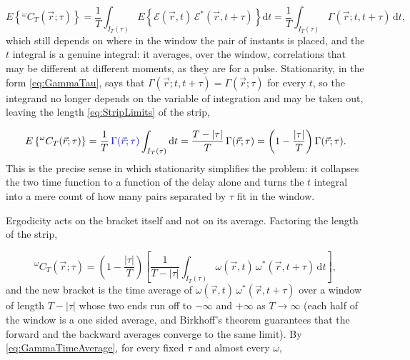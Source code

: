 		\begin{equation}\label{eq:CTnoHyp}
			E\left\{{}^{\omega}C_{T}(\vec{r};\tau)\right\} = \frac{1}{T}\int_{I_{T}(\tau)}E\left\{\mathcal{E}(\vec{r},t)\,\mathcal{E}^{*}(\vec{r},t+\tau)\right\}\mathrm{d}t
			= \frac{1}{T}\int_{I_{T}(\tau)}\Gamma(\vec{r};t,t+\tau)\,\mathrm{d}t ,
		\end{equation}
		which still depends on where in the window the pair of instants is placed, and the $t$
		integral is a genuine integral: it averages, over the window, correlations that may be
		different at different moments, as they are for a pulse. Stationarity, in the form
		\eqref{eq:GammaTau}, says that $\Gamma(\vec{r};t,t+\tau)=\Gamma(\vec{r};\tau)$ for every
		$t$, so the integrand no longer depends on the variable of integration and may be taken
		out, leaving the length \eqref{eq:StripLimits} of the strip,

		\begin{equation}\label{eq:CTstationary}
			E\left\{{}^{\omega}C_{T}(\vec{r};\tau)\right\} = \frac{1}{T}\,\textcolor{blue}{\Gamma(\vec{r};\tau)}\int_{I_{T}(\tau)}\mathrm{d}t
			= \frac{T-|\tau|}{T}\,\Gamma(\vec{r};\tau) = \left(1-\frac{|\tau|}{T}\right)\Gamma(\vec{r};\tau) .
		\end{equation}
		This is the precise sense in which stationarity simplifies the problem: it collapses the
		two time function to a function of the delay alone and turns the $t$ integral into a
		mere count of how many pairs separated by $\tau$ fit in the window.

		Ergodicity acts on the bracket itself and not on its average. Factoring the length of
		the strip,

		\begin{equation}\label{eq:CTergodic}
			{}^{\omega}C_{T}(\vec{r};\tau) = \left(1-\frac{|\tau|}{T}\right)\left[\frac{1}{T-|\tau|}\int_{I_{T}(\tau)}\omega(\vec{r},t)\,\omega^{*}(\vec{r},t+\tau)\,\mathrm{d}t\right],
		\end{equation}
		and the new bracket is the time average of $\omega(\vec{r},t)\,\omega^{*}(\vec{r},t+\tau)$
		over a window of length $T-|\tau|$ whose two ends run off to $-\infty$ and $+\infty$ as
		$T\to\infty$ (each half of the window is a one sided average, and Birkhoff's theorem
		guarantees that the forward and the backward averages converge to the same limit). By
		\eqref{eq:GammaTimeAverage}, for every fixed $\tau$ and almost every $\omega$,

